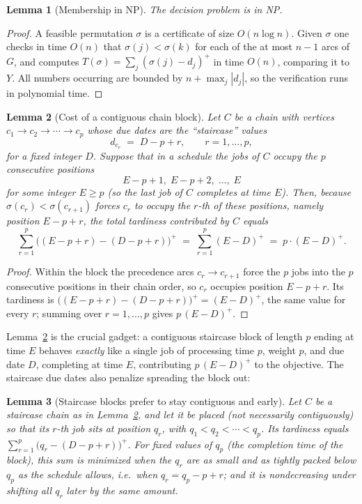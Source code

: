 \documentclass{amsart}
\newtheorem{lemma}{Lemma}
\theoremstyle{definition}
\theoremstyle{remark}
\begin{document}
\begin{lemma}[Membership in NP]\label{lem:np}
The decision problem is in NP.
\end{lemma}

\begin{proof}
A feasible permutation $\sigma$ is a certificate of size $O(n\log n)$. Given $\sigma$ one
checks in time $O(n)$ that $\sigma(j)<\sigma(k)$ for each of the at most $n-1$ arcs of
$G$, and computes $T(\sigma)=\sum_j(\sigma(j)-d_j)^{+}$ in time $O(n)$, comparing it to
$Y$. All numbers occurring are bounded by $n+\max_j|d_j|$, so the verification runs in
polynomial time.
\end{proof}

\begin{lemma}[Cost of a contiguous chain block]\label{lem:block}
Let $C$ be a chain with vertices $c_1\to c_2\to\cdots\to c_p$ whose due dates are the
``staircase'' values
\[
   d_{c_r}\;=\;D-p+r,\qquad r=1,\dots,p,
\]
for a fixed integer $D$. Suppose that in a schedule the jobs of $C$ occupy the $p$
consecutive positions
\[
   E-p+1,\;E-p+2,\;\dots,\;E
\]
for some integer $E\ge p$ \textup{(}so the last job of $C$ completes at time $E$\textup{)}.
Then, because $\sigma(c_r)<\sigma(c_{r+1})$ forces $c_r$ to occupy the $r$-th of these
positions, namely position $E-p+r$, the total tardiness contributed by $C$ equals
\[
   \sum_{r=1}^{p}\bigl((E-p+r)-(D-p+r)\bigr)^{+}
   \;=\;\sum_{r=1}^{p}(E-D)^{+}
   \;=\;p\cdot (E-D)^{+}.
\]
\end{lemma}

\begin{proof}
Within the block the precedence arcs $c_r\to c_{r+1}$ force the $p$ jobs into the $p$
consecutive positions in their chain order, so $c_r$ occupies position $E-p+r$. Its
tardiness is $\bigl((E-p+r)-(D-p+r)\bigr)^{+}=(E-D)^{+}$, the same value for every
$r$; summing over $r=1,\dots,p$ gives $p\,(E-D)^{+}$.
\end{proof}

Lemma~\ref{lem:block} is the crucial gadget: a contiguous staircase block of length $p$
ending at time $E$ behaves \emph{exactly} like a single job of processing time $p$,
weight $p$, and due date $D$, completing at time $E$, contributing $p\,(E-D)^{+}$ to the
objective. The staircase due dates also penalize spreading the block out:

\begin{lemma}[Staircase blocks prefer to stay contiguous and early]\label{lem:spread}
Let $C$ be a staircase chain as in Lemma~\ref{lem:block}, and let it be placed
(not necessarily contiguously) so that its $r$-th job sits at position $q_r$, with
$q_1<q_2<\cdots<q_p$. Its tardiness equals
$\sum_{r=1}^{p}\bigl(q_r-(D-p+r)\bigr)^{+}$. For fixed values of $q_p$ (the completion
time of the block), this sum is minimized when the $q_r$ are as small and as tightly
packed below $q_p$ as the schedule allows, i.e.\ when $q_r=q_p-p+r$; and it is
nondecreasing under shifting all $q_r$ later by the same amount.
\end{lemma}
\end{document}
